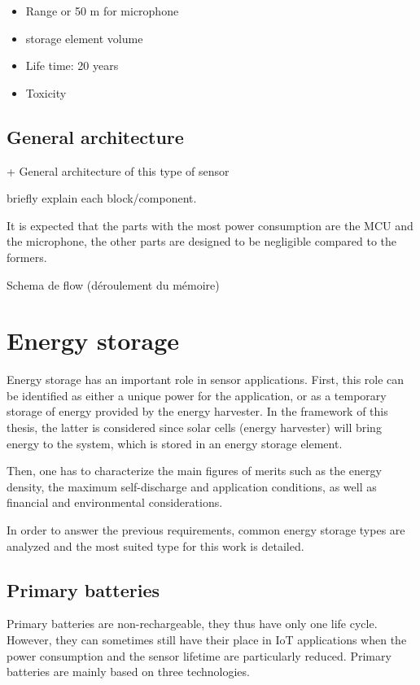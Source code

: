 \documentclass{EPL-master-thesis-covers-EN}
\begin{document}
\begin{itemize}
 \item Range or 50 m for microphone
 \item storage element volume
 \item Life time: 20 years
 \item Toxicity
\end{itemize}



\section{General architecture}


+ General architecture of this type of sensor

briefly explain each block/component.

It is expected that the parts with the most power consumption are the MCU and the microphone, the other parts are designed to be negligible compared to the formers.

Schema de flow (déroulement du mémoire)

\chapter{Energy storage}

Energy storage has an important role in sensor applications. First, this role can be identified as either a unique power for the application, or as a temporary storage of energy provided by the energy harvester. In the framework of this thesis, the latter is considered since solar cells (energy harvester) will bring energy to the system, which is stored in an energy storage element.

Then, one has to characterize the main figures of merits such as the energy density, the maximum self-discharge and application conditions, as well as financial and environmental considerations.

In order to answer the previous requirements, common energy storage types are analyzed and the most suited type for this work is detailed.

\section{Primary batteries}

Primary batteries are non-rechargeable, they thus have only one life cycle. However, they can sometimes still have their place in IoT applications when the power consumption and the sensor lifetime are particularly reduced. Primary batteries are mainly based on three technologies.
\end{document}
